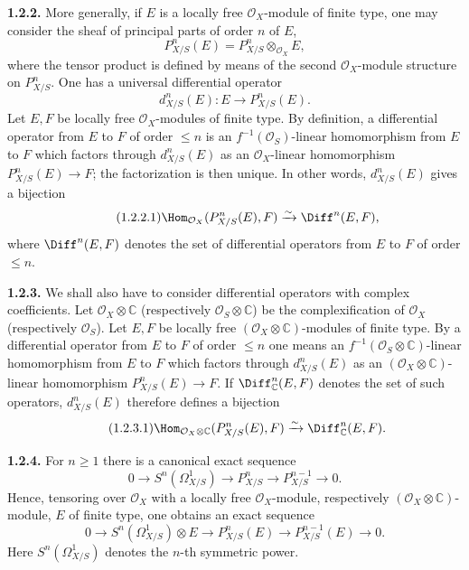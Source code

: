 \textbf{1.2.2.} More generally, if $E$ is a locally free $\mathcal O_X$-module of finite type, one may consider the sheaf of principal parts of order $n$ of $E$,
\[
 P^n_{X/S}(E)=P^n_{X/S}\otimes_{\mathcal O_X}E,
\]
where the tensor product is defined by means of the second $\mathcal O_X$-module structure on $P^n_{X/S}$. One has a universal differential operator
\[
 d^n_{X/S}(E):E\longrightarrow P^n_{X/S}(E).
\]
Let $E,F$ be locally free $\mathcal O_X$-modules of finite type. By definition, a differential operator from $E$ to $F$ of order $\le n$ is an $f^{-1}(\mathcal O_S)$-linear homomorphism from $E$ to $F$ which factors through $d^n_{X/S}(E)$ as an $\mathcal O_X$-linear homomorphism $P^n_{X/S}(E)\to F$; the factorization is then unique. In other words, $d^n_{X/S}(E)$ gives a bijection
\begin{equation}\tag{1.2.2.1}
 \Hom_{\mathcal O_X}(P^n_{X/S}(E),F)\xrightarrow{\sim}\Diff^n(E,F),
\end{equation}
where $\Diff^n(E,F)$ denotes the set of differential operators from $E$ to $F$ of order $\le n$.

\textbf{1.2.3.} We shall also have to consider differential operators with complex coefficients. Let $\mathcal O_X\otimes\mathbb C$ (respectively $\mathcal O_S\otimes\mathbb C$) be the complexification of $\mathcal O_X$ (respectively $\mathcal O_S$). Let $E,F$ be locally free $(\mathcal O_X\otimes\mathbb C)$-modules of finite type. By a differential operator from $E$ to $F$ of order $\le n$ one means an $f^{-1}(\mathcal O_S\otimes\mathbb C)$-linear homomorphism from $E$ to $F$ which factors through $d^n_{X/S}(E)$ as an $(\mathcal O_X\otimes\mathbb C)$-linear homomorphism $P^n_{X/S}(E)\to F$. If $\Diff^n_{\mathbb C}(E,F)$ denotes the set of such operators, $d^n_{X/S}(E)$ therefore defines a bijection
\begin{equation}\tag{1.2.3.1}
 \Hom_{\mathcal O_X\otimes\mathbb C}(P^n_{X/S}(E),F)
 \xrightarrow{\sim}\Diff^n_{\mathbb C}(E,F).
\end{equation}

\textbf{1.2.4.} For $n\ge1$ there is a canonical exact sequence
\[
 0\longrightarrow S^n(\Omega^1_{X/S})\longrightarrow P^n_{X/S}
 \longrightarrow P^{n-1}_{X/S}\longrightarrow 0.
\]
Hence, tensoring over $\mathcal O_X$ with a locally free $\mathcal O_X$-module, respectively $(\mathcal O_X\otimes\mathbb C)$-module, $E$ of finite type, one obtains an exact sequence
\begin{equation}\tag{1.2.4.1}
0\longrightarrow S^n(\Omega^1_{X/S})\otimes E\longrightarrow P^n_{X/S}(E)
\longrightarrow P^{n-1}_{X/S}(E)\longrightarrow0.
\end{equation}
Here $S^n(\Omega^1_{X/S})$ denotes the $n$-th symmetric power.

